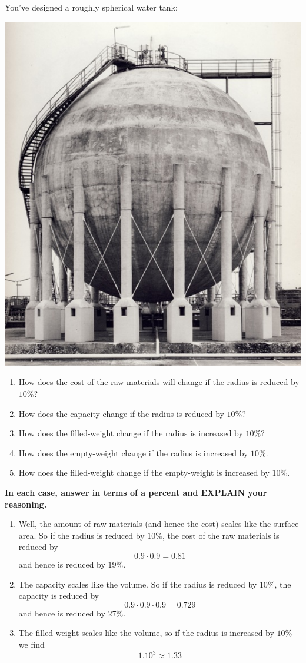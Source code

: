 \documentclass[nooutcomes,noauthor,handout,12pt]{ximera}
\begin{document}
\begin{question} 
  You've designed a roughly spherical water tank:
\begin{center}%
  \includegraphics[width=.4\textwidth]{tank.png}  
\end{center}
\begin{enumerate}
\item How does the cost of the raw materials will change if the radius
  is reduced by $10\%$?
\item How does the capacity change if the radius is reduced by $10\%$?
\item How does the filled-weight change if the radius is increased by
  $10\%$?
\item How does the empty-weight change if the radius is increased by
  $10\%$.
\item How does the filled-weight change if the empty-weight is
  increased by $10\%$.
\end{enumerate}
\textbf{In each case, answer in terms of a percent and EXPLAIN your reasoning.}
\begin{freeResponse}
  \begin{enumerate}
  \item Well, the amount of raw materials (and hence the cost) scales
    like the surface area. So if the radius is reduced by $10\%$, the
    cost of the raw materials is reduced by
    \[
    0.9\cdot 0.9 = 0.81
    \]
    and hence is reduced by $19\%$.
  \item The capacity scales like the volume.  So if the radius is
    reduced by $10\%$, the capacity is reduced by
    \[
    0.9\cdot 0.9\cdot 0.9 = 0.729
    \]
    and hence is reduced by $27\%$.
  \item The filled-weight scales like the volume, so if the radius is
    increased by $10\%$ we find
    \[
    1.10^3 \approx 1.33
\]
\end{enumerate}
\end{freeResponse}
\end{question}
\end{document}
